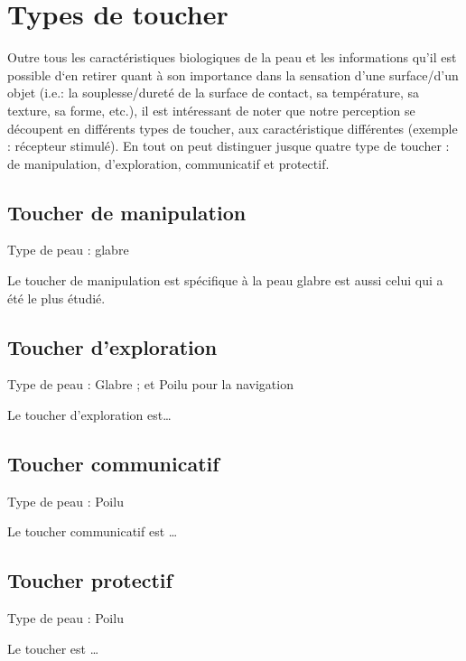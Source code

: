 \section{Types de toucher}
Outre tous les caractéristiques biologiques de la peau et les informations qu’il est possible d‘en retirer quant à son importance dans la sensation d’une surface/d’un objet (i.e.: la souplesse/dureté de la surface de contact, sa température, sa texture, sa forme, etc.), il est intéressant de noter que notre perception se découpent en différents types de toucher, aux caractéristique différentes (exemple : récepteur stimulé). En tout on peut distinguer jusque quatre type de toucher : de manipulation, d’exploration, communicatif et protectif.\par

\subsection{Toucher de manipulation}
Type de peau : glabre\par

Le toucher de manipulation est spécifique à la peau glabre est aussi celui qui a été le plus étudié.

\subsection{Toucher d’exploration}
Type de peau : Glabre ; et Poilu pour la navigation\par
Le toucher d’exploration est…

\subsection{Toucher communicatif}
Type de peau : Poilu\par
Le toucher communicatif est …

\subsection{Toucher protectif}
Type de peau : Poilu\par
Le toucher est …




